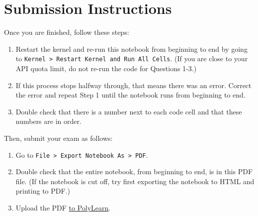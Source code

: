 \documentclass[11pt]{article}
\providecommand{\tightlist}{%
      \setlength{\itemsep}{0pt}\setlength{\parskip}{0pt}}
\begin{document}
    \hypertarget{submission-instructions}{%
\section{Submission Instructions}\label{submission-instructions}}

Once you are finished, follow these steps:

\begin{enumerate}
\def\labelenumi{\arabic{enumi}.}
\tightlist
\item
  Restart the kernel and re-run this notebook from beginning to end by
  going to
  \texttt{Kernel\ \textgreater{}\ Restart\ Kernel\ and\ Run\ All\ Cells}.
  (If you are close to your API quota limit, do not re-run the code for
  Questions 1-3.)
\item
  If this process stops halfway through, that means there was an error.
  Correct the error and repeat Step 1 until the notebook runs from
  beginning to end.
\item
  Double check that there is a number next to each code cell and that
  these numbers are in order.
\end{enumerate}

Then, submit your exam as follows:

\begin{enumerate}
\def\labelenumi{\arabic{enumi}.}
\tightlist
\item
  Go to
  \texttt{File\ \textgreater{}\ Export\ Notebook\ As\ \textgreater{}\ PDF}.
\item
  Double check that the entire notebook, from beginning to end, is in
  this PDF file. (If the notebook is cut off, try first exporting the
  notebook to HTML and printing to PDF.)
\item
  Upload the PDF
  \href{https://polylearn.calpoly.edu/AY_2018-2019/mod/assign/view.php?id=343940}{to
  PolyLearn}.
\end{enumerate}


    
    
    
    
\end{document}
